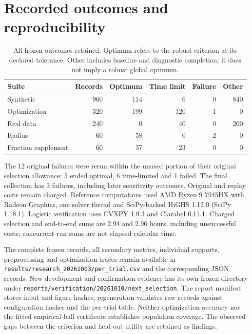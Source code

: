 \documentclass[11pt,a4paper]{article}
\begin{document}
\FloatBarrier
\section{Recorded outcomes and reproducibility}\label{sec:records}
\begin{table}[htbp]\centering\small\setlength{\tabcolsep}{3.5pt}
\caption{All frozen outcomes retained. Optimum refers to the robust criterion at its declared tolerance. Other includes baseline and diagnostic completion; it does not imply a robust global optimum.}\label{tab:outcomes}
\begin{tabularx}{\linewidth}{@{}Yrrrrr@{}}
\toprule Suite & Records & Optimum & Time limit & Failure & Other \\
\midrule
Synthetic & 960 & 114 & 6 & 0 & 840 \\
Optimization & 320 & 199 & 120 & 1 & 0 \\
Real data & 240 & 0 & 40 & 0 & 200 \\
Radius & 60 & 58 & 0 & 2 & 0 \\
Fraction supplement & 60 & 37 & 23 & 0 & 0 \\
\bottomrule\end{tabularx}\end{table}
The 12 original failures were rerun within the unused portion of their original selection allowance: 5 ended optimal, 6 time-limited and 1 failed. The final collection has 3 failures, including later sensitivity outcomes. Original and replay costs remain charged.
Reference computations used AMD Ryzen 9 7945HX with Radeon Graphics, one solver thread and SciPy-backed HiGHS 1.12.0 (SciPy 1.18.1). Logistic verification uses CVXPY 1.9.3 and Clarabel 0.11.1. Charged selection and end-to-end sums are 2.94 and 2.96 hours, including unsuccessful costs; concurrent-run sums are not elapsed calendar time.


The complete frozen records, all secondary metrics, individual supports,
preprocessing and optimization traces remain available in
\texttt{results/research\_20261003/per\_trial.csv} and the corresponding JSON records.
New development and confirmation evidence has its own frozen directory under
\texttt{reports/verification/20261010/next\_selection}. The report manifest stores
input and figure hashes; regeneration validates raw records against configuration
hashes and the per-trial table. Neither optimization accuracy nor the fitted
empirical-ball certificate establishes population coverage. The observed gaps
between the criterion and held-out utility are retained as findings.
\end{document}

